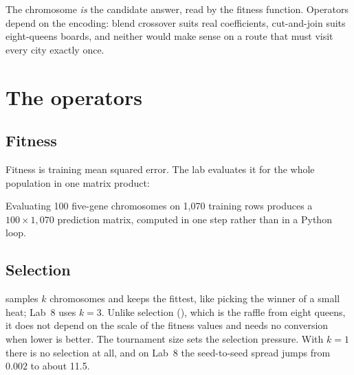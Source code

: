 \begin{intuition}
The chromosome \emph{is} the candidate answer, read by the fitness function. Operators depend on the encoding: blend crossover suits real coefficients, cut-and-join suits eight-queens boards, and neither would make sense on a route that must visit every city exactly once.
\end{intuition}

\section{The operators}

\subsection{Fitness}

Fitness is training mean squared error. The lab evaluates it for the whole population in one matrix product:



Evaluating 100 five-gene chromosomes on 1,070 training rows produces a $100\times1{,}070$ prediction matrix, computed in one step rather than in a Python loop.

\subsection{Selection}

 samples $k$ chromosomes and keeps the fittest, like picking the winner of a small heat; Lab~8 uses $k=3$. Unlike  selection (), which is the raffle from eight queens, it does not depend on the scale of the fitness values and needs no conversion when lower is better. The tournament size sets the selection pressure. With $k=1$ there is no selection at all, and on Lab~8 the seed-to-seed spread jumps from $0.002$ to about 11.5.

